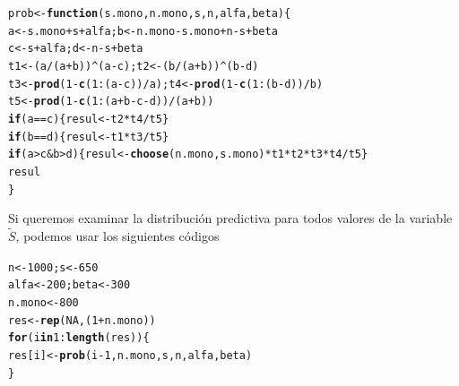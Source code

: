 \documentclass[10pt,openright]{book}\usepackage[]{graphicx}\usepackage[]{color}
\makeatletter
\newcommand{\hlnum}[1]{\textcolor[rgb]{0.686,0.059,0.569}{#1}}%
\newcommand{\hlopt}[1]{\textcolor[rgb]{0,0,0}{#1}}%
\newcommand{\hlstd}[1]{\textcolor[rgb]{0.345,0.345,0.345}{#1}}%
\newcommand{\hlkwa}[1]{\textcolor[rgb]{0.161,0.373,0.58}{\textbf{#1}}}%
\newcommand{\hlkwb}[1]{\textcolor[rgb]{0.69,0.353,0.396}{#1}}%
\newcommand{\hlkwc}[1]{\textcolor[rgb]{0.333,0.667,0.333}{#1}}%
\newcommand{\hlkwd}[1]{\textcolor[rgb]{0.737,0.353,0.396}{\textbf{#1}}}%
\newenvironment{kframe}{%
 \def\at@end@of@kframe{}%
 \ifinner\ifhmode%
  \def\at@end@of@kframe{\end{minipage}}%
  \begin{minipage}{\columnwidth}%
 \fi\fi%
 \def\FrameCommand##1{\hskip\@totalleftmargin \hskip-\fboxsep
 \colorbox{shadecolor}{##1}\hskip-\fboxsep
     \hskip-\linewidth \hskip-\@totalleftmargin \hskip\columnwidth}%
 \MakeFramed {\advance\hsize-\width
   \@totalleftmargin\z@ \linewidth\hsize
   \@setminipage}}%
 {\par\unskip\endMakeFramed%
 \at@end@of@kframe}
\newenvironment{knitrout}{}{} %
\makeatother
\begin{document}
\begin{knitrout}
\color{fgcolor}\begin{kframe}
\begin{alltt}
\hlstd{prob}\hlkwb{<-}\hlkwa{function}\hlstd{(}\hlkwc{s.mono}\hlstd{,}\hlkwc{n.mono}\hlstd{,}\hlkwc{s}\hlstd{,}\hlkwc{n}\hlstd{,}\hlkwc{alfa}\hlstd{,}\hlkwc{beta}\hlstd{)\{}
  \hlstd{a}\hlkwb{<-}\hlstd{s.mono}\hlopt{+}\hlstd{s}\hlopt{+}\hlstd{alfa; b}\hlkwb{<-}\hlstd{n.mono}\hlopt{-}\hlstd{s.mono}\hlopt{+}\hlstd{n}\hlopt{-}\hlstd{s}\hlopt{+}\hlstd{beta}
  \hlstd{c}\hlkwb{<-}\hlstd{s}\hlopt{+}\hlstd{alfa; d}\hlkwb{<-}\hlstd{n}\hlopt{-}\hlstd{s}\hlopt{+}\hlstd{beta}
  \hlstd{t1}\hlkwb{<-}\hlstd{(a}\hlopt{/}\hlstd{(a}\hlopt{+}\hlstd{b))}\hlopt{^}\hlstd{(a}\hlopt{-}\hlstd{c); t2}\hlkwb{<-}\hlstd{(b}\hlopt{/}\hlstd{(a}\hlopt{+}\hlstd{b))}\hlopt{^}\hlstd{(b}\hlopt{-}\hlstd{d)}
  \hlstd{t3}\hlkwb{<-}\hlkwd{prod}\hlstd{(}\hlnum{1}\hlopt{-}\hlkwd{c}\hlstd{(}\hlnum{1}\hlopt{:}\hlstd{(a}\hlopt{-}\hlstd{c))}\hlopt{/}\hlstd{a); t4}\hlkwb{<-}\hlkwd{prod}\hlstd{(}\hlnum{1}\hlopt{-}\hlkwd{c}\hlstd{(}\hlnum{1}\hlopt{:}\hlstd{(b}\hlopt{-}\hlstd{d))}\hlopt{/}\hlstd{b)}
  \hlstd{t5}\hlkwb{<-}\hlkwd{prod}\hlstd{(}\hlnum{1}\hlopt{-}\hlkwd{c}\hlstd{(}\hlnum{1}\hlopt{:}\hlstd{(a}\hlopt{+}\hlstd{b}\hlopt{-}\hlstd{c}\hlopt{-}\hlstd{d))}\hlopt{/}\hlstd{(a}\hlopt{+}\hlstd{b))}
  \hlkwa{if}\hlstd{(a}\hlopt{==}\hlstd{c)\{resul}\hlkwb{<-} \hlstd{t2}\hlopt{*}\hlstd{t4}\hlopt{/}\hlstd{t5\}}
  \hlkwa{if}\hlstd{(b}\hlopt{==}\hlstd{d)\{resul}\hlkwb{<-}\hlstd{t1}\hlopt{*}\hlstd{t3}\hlopt{/}\hlstd{t5\}}
  \hlkwa{if}\hlstd{(a}\hlopt{>}\hlstd{c}\hlopt{&}\hlstd{b}\hlopt{>}\hlstd{d)\{resul}\hlkwb{<-}\hlkwd{choose}\hlstd{(n.mono,s.mono)}\hlopt{*}\hlstd{t1}\hlopt{*}\hlstd{t2}\hlopt{*}\hlstd{t3}\hlopt{*}\hlstd{t4}\hlopt{/}\hlstd{t5\}}
  \hlstd{resul}
\hlstd{\}}
\end{alltt}
\end{kframe}
\end{knitrout}
    
    
    Si queremos examinar la distribuci\'on predictiva para todos valores de la variable $\tilde{S}$, podemos usar los siguientes c\'odigos
\begin{knitrout}
\color{fgcolor}\begin{kframe}
\begin{alltt}
\hlstd{n}\hlkwb{<-}\hlnum{1000}\hlstd{; s}\hlkwb{<-}\hlnum{650}
\hlstd{alfa}\hlkwb{<-}\hlnum{200}\hlstd{; beta}\hlkwb{<-}\hlnum{300}
\hlstd{n.mono}\hlkwb{<-}\hlnum{800}
\hlstd{res}\hlkwb{<-}\hlkwd{rep}\hlstd{(}\hlnum{NA}\hlstd{,(}\hlnum{1}\hlopt{+}\hlstd{n.mono))}
\hlkwa{for}\hlstd{(i} \hlkwa{in} \hlnum{1}\hlopt{:}\hlkwd{length}\hlstd{(res))\{}
  \hlstd{res[i]}\hlkwb{<-}\hlkwd{prob}\hlstd{(i}\hlopt{-}\hlnum{1}\hlstd{,n.mono,s,n,alfa,beta)}
\hlstd{\}}
\end{alltt}
\end{kframe}
\end{knitrout}
    
\end{document}
